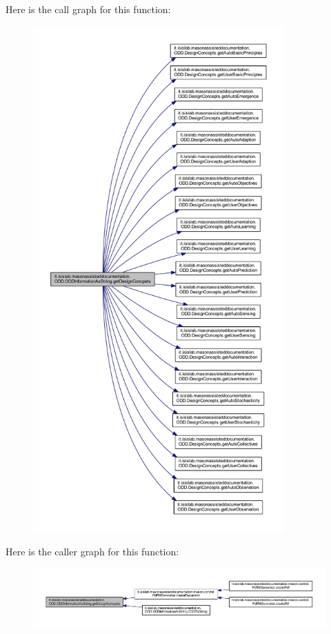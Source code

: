 Here is the call graph for this function\-:
\nopagebreak
\begin{figure}[H]
\begin{center}
\leavevmode
\includegraphics[height=550pt]{classit_1_1isislab_1_1masonassisteddocumentation_1_1_o_d_d_1_1_o_d_d_information_as_string_a8ea3455b80112a986f25426327836b85_cgraph}
\end{center}
\end{figure}




Here is the caller graph for this function\-:
\nopagebreak
\begin{figure}[H]
\begin{center}
\leavevmode
\includegraphics[width=350pt]{classit_1_1isislab_1_1masonassisteddocumentation_1_1_o_d_d_1_1_o_d_d_information_as_string_a8ea3455b80112a986f25426327836b85_icgraph}
\end{center}
\end{figure}


